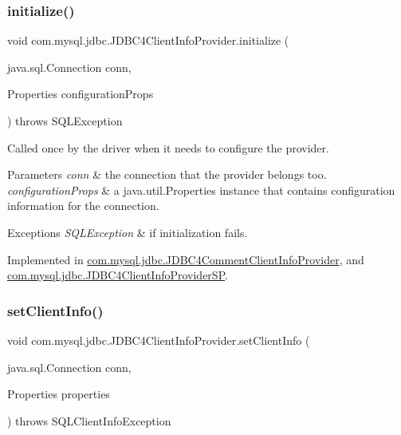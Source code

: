 \subsubsection{\texorpdfstring{initialize()}{initialize()}}
{\footnotesize\ttfamily void com.\+mysql.\+jdbc.\+J\+D\+B\+C4\+Client\+Info\+Provider.\+initialize (\begin{DoxyParamCaption}\item[{java.\+sql.\+Connection}]{conn,  }\item[{Properties}]{configuration\+Props }\end{DoxyParamCaption}) throws S\+Q\+L\+Exception}

Called once by the driver when it needs to configure the provider.


\begin{DoxyParams}{Parameters}
{\em conn} & the connection that the provider belongs too. \\
\hline
{\em configuration\+Props} & a java.\+util.\+Properties instance that contains configuration information for the connection. \\
\hline
\end{DoxyParams}

\begin{DoxyExceptions}{Exceptions}
{\em S\+Q\+L\+Exception} & if initialization fails. \\
\hline
\end{DoxyExceptions}


Implemented in \mbox{\hyperlink{classcom_1_1mysql_1_1jdbc_1_1_j_d_b_c4_comment_client_info_provider_a4bac1954180325c5961e2e5270be7ced}{com.\+mysql.\+jdbc.\+J\+D\+B\+C4\+Comment\+Client\+Info\+Provider}}, and \mbox{\hyperlink{classcom_1_1mysql_1_1jdbc_1_1_j_d_b_c4_client_info_provider_s_p_a5b14375f29d2bbe6298559600801cebc}{com.\+mysql.\+jdbc.\+J\+D\+B\+C4\+Client\+Info\+Provider\+SP}}.

\mbox{\label{interfacecom_1_1mysql_1_1jdbc_1_1_j_d_b_c4_client_info_provider_ac2ed3391acf830bcb04941654e2cefe3}} 
\subsubsection{\texorpdfstring{set\+Client\+Info()}{setClientInfo()}\hspace{0.1cm}{\footnotesize\ttfamily [1/2]}}
{\footnotesize\ttfamily void com.\+mysql.\+jdbc.\+J\+D\+B\+C4\+Client\+Info\+Provider.\+set\+Client\+Info (\begin{DoxyParamCaption}\item[{java.\+sql.\+Connection}]{conn,  }\item[{Properties}]{properties }\end{DoxyParamCaption}) throws S\+Q\+L\+Client\+Info\+Exception}

